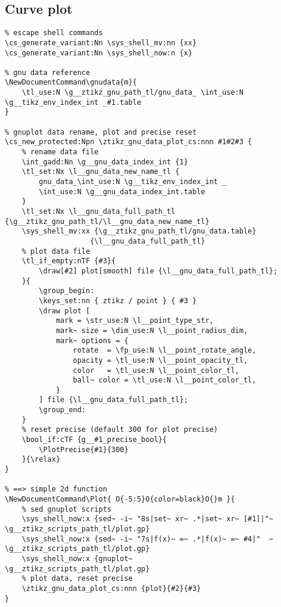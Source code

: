 \subsection{Curve plot}
\begin{verbatim}
% escape shell commands 
\cs_generate_variant:Nn \sys_shell_mv:nn {xx}
\cs_generate_variant:Nn \sys_shell_now:n {x}

% gnu data reference
\NewDocumentCommand\gnudata{m}{
    \tl_use:N \g__ztikz_gnu_path_tl/gnu_data_ \int_use:N \g__tikz_env_index_int _#1.table
}

% gnuplot data rename, plot and precise reset
\cs_new_protected:Npn \ztikz_gnu_data_plot_cs:nnn #1#2#3 {
    % rename data file
    \int_gadd:Nn \g__gnu_data_index_int {1}
    \tl_set:Nx \l__gnu_data_new_name_tl {
        gnu_data_\int_use:N \g__tikz_env_index_int _
        \int_use:N \g__gnu_data_index_int.table
    }
    \tl_set:Nx \l__gnu_data_full_path_tl {\g__ztikz_gnu_path_tl/\l__gnu_data_new_name_tl}
    \sys_shell_mv:xx {\g__ztikz_gnu_path_tl/gnu_data.table}
                    {\l__gnu_data_full_path_tl}
    % plot data file
    \tl_if_empty:nTF {#3}{
        \draw[#2] plot[smooth] file {\l__gnu_data_full_path_tl};
    }{
        \group_begin:
        \keys_set:nn { ztikz / point } { #3 }
        \draw plot [
            mark = \str_use:N \l__point_type_str, 
            mark~ size = \dim_use:N \l__point_radius_dim,
            mark~ options = {
                rotate  = \fp_use:N \l__point_rotate_angle, 
                opacity = \tl_use:N \l__point_opacity_tl, 
                color   = \tl_use:N \l__point_color_tl,
                ball~ color = \tl_use:N \l__point_color_tl,
            }
        ] file {\l__gnu_data_full_path_tl};
        \group_end:
    }
    % reset precise (default 300 for plot precise)
    \bool_if:cTF {g__#1_precise_bool}{
        \PlotPrecise{#1}{300}
    }{\relax}
}

% ==> simple 2d function
\NewDocumentCommand\Plot{ O{-5:5}O{color=black}O{}m }{
    % sed gnuplot scripts
    \sys_shell_now:x {sed~ -i~ "8s|set~ xr~ .*|set~ xr~ [#1]|"~ \g__ztikz_scripts_path_tl/plot.gp}
    \sys_shell_now:x {sed~ -i~ "7s|f(x)~ =~ .*|f(x)~ =~ #4|"  ~ \g__ztikz_scripts_path_tl/plot.gp}
    \sys_shell_now:x {gnuplot~                                  \g__ztikz_scripts_path_tl/plot.gp}
    % plot data, reset precise
    \ztikz_gnu_data_plot_cs:nnn {plot}{#2}{#3}
}


\end{verbatim}

